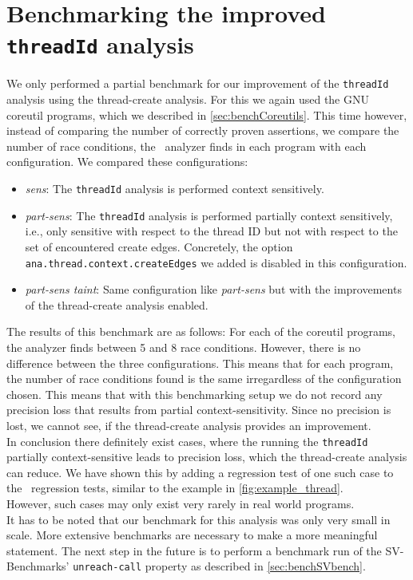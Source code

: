   \section{Benchmarking the improved \texttt{threadId} analysis}
    We only performed a partial benchmark for our improvement of the \texttt{threadId} analysis using the thread-create analysis. For this we again used the GNU coreutil programs, which we described in \autoref{sec:benchCoreutils}. This time however, instead of comparing the number of correctly proven assertions, we compare the number of race conditions, the \gob\ analyzer finds in each program with each configuration. We compared these configurations:
    \begin{itemize}
      \item \textit{sens}: The \texttt{threadId} analysis is performed context sensitively.
      \item \textit{part-sens}: The \texttt{threadId} analysis is performed partially context sensitively, i.e., only sensitive with respect to the thread ID but not with respect to the set of encountered create edges. Concretely, the option \texttt{ana.thread.context.createEdges} we added is disabled in this configuration.
      \item \textit{part-sens taint}: Same configuration like \textit{part-sens} but with the improvements of the thread-create analysis enabled.
    \end{itemize}
    The results of this benchmark are as follows: For each of the coreutil programs, the analyzer finds between 5 and 8 race conditions. However, there is no difference between the three configurations. This means that for each program, the number of race conditions found is the same irregardless of the configuration chosen. This means that with this benchmarking setup we do not record any precision loss that results from partial context-sensitivity. Since no precision is lost, we cannot see, if the thread-create analysis provides an improvement.
    \\
    In conclusion there definitely exist cases, where the running the \texttt{threadId} partially context-sensitive leads to precision loss, which the thread-create analysis can reduce. We have shown this by adding a regression test of one such case to the \gob\ regression tests, similar to the example in \autoref{fig:example_thread}.\\
    However, such cases may only exist very rarely in real world programs.\\
    It has to be noted that our benchmark for this analysis was only very small in scale. More extensive benchmarks are necessary to make a more meaningful statement. The next step in the future is to perform a benchmark run of the SV-Benchmarks' \texttt{unreach-call} property as described in \autoref{sec:benchSVbench}.
